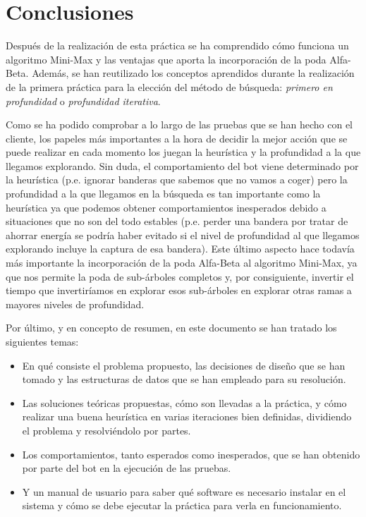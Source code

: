 \chapter {Conclusiones}

Después de la realización de esta práctica se ha comprendido cómo
funciona un algoritmo Mini-Max y las ventajas que aporta la
incorporación de la poda Alfa-Beta. Además, se han reutilizado los
conceptos aprendidos durante la realización de la primera práctica
para la elección del método de búsqueda: \emph{primero en profundidad} o
\emph{profundidad iterativa}.

Como se ha podido comprobar a lo largo de las pruebas que se han hecho
con el cliente, los papeles más importantes a la hora de decidir la
mejor acción que se puede realizar en cada momento los juegan la
heurística y la profundidad a la que llegamos explorando. Sin duda, el
comportamiento del bot viene determinado por la heurística (p.e. ignorar
banderas que sabemos que no vamos a coger) pero la profundidad a la
que llegamos en la búsqueda es tan importante como la heurística ya
que podemos obtener comportamientos inesperados debido a situaciones
que no son del todo estables (p.e. perder una bandera por tratar de
ahorrar energía se podría haber evitado si el nivel de profundidad al
que llegamos explorando incluye la captura de esa bandera). Este
último aspecto hace todavía más importante la incorporación de la poda
Alfa-Beta al algoritmo Mini-Max, ya que nos permite la poda de
sub-árboles completos y, por consiguiente, invertir el tiempo que
invertiríamos en explorar esos sub-árboles en explorar otras ramas a
mayores niveles de profundidad.

Por último, y en concepto de resumen, en este documento se han tratado
los siguientes temas:
\begin{itemize}
\item En qué consiste el problema propuesto, las decisiones de diseño
  que se han tomado y las estructuras de datos que se han empleado
  para su resolución.
\item Las soluciones teóricas propuestas, cómo son llevadas a la
  práctica, y cómo realizar una buena heurística en varias iteraciones
  bien definidas, dividiendo el problema y resolviéndolo por partes.
\item Los comportamientos, tanto esperados como inesperados, que se
  han obtenido por parte del bot en la ejecución de las pruebas.
\item Y un manual de usuario para saber qué software es necesario
  instalar en el sistema y cómo se debe ejecutar la práctica para
  verla en funcionamiento.
\end{itemize}

